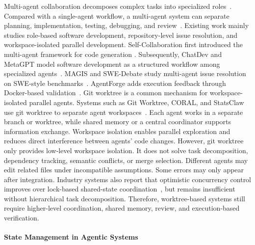\documentclass{article}
\begin{document}
Multi-agent collaboration decomposes complex tasks into specialized roles~\citep{selfcollaboration,chatdev,metagpt,autogen}. Compared with a single-agent workflow, a multi-agent system can separate planning, implementation, testing, debugging, and review~\citep{magis,swedebate,agentforge}. Existing work mainly studies role-based software development, repository-level issue resolution, and workspace-isolated parallel development. Self-Collaboration \citep{selfcollaboration} first introduced the multi-agent framework for code generation \citep{codeagentsurvey}\nocite{dong2026iocodediscoveryagent}. Subsequently, ChatDev and MetaGPT model software development as a structured workflow among specialized agents~\citep{chatdev,metagpt}. MAGIS and SWE-Debate study multi-agent issue resolution on SWE-style benchmarks~\citep{magis,swedebate}. AgentForge adds execution feedback through Docker-based validation~\citep{agentforge}. Git worktree is a common mechanism for workspace-isolated parallel agents. Systems such as Git Worktree, CORAL, and StatsClaw use git worktree to separate agent workspaces~\citep{caid,coral,statsclaw}. Each agent works in a separate branch or worktree, while shared memory or a central coordinator supports information exchange. Workspace isolation enables parallel exploration and reduces direct interference between agents' code changes.
However, git worktree only provides low-level workspace isolation. It does not solve task decomposition, dependency tracking, semantic conflicts, or merge selection. Different agents may edit related files under incompatible assumptions. Some errors may only appear after integration. Industry systems also report that optimistic concurrency control improves over lock-based shared-state coordination~\citep{cursorScalingAgents}, but remains insufficient without hierarchical task decomposition. Therefore, worktree-based systems still require higher-level coordination, shared memory, review, and execution-based verification.


\paragraph{State Management in Agentic Systems}
\label{sec:related-state}
\end{document}
